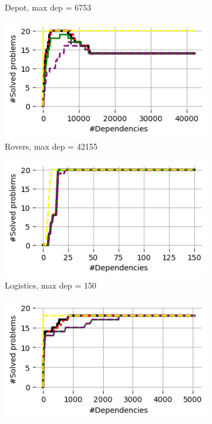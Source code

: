\documentclass{article}
\theoremstyle{remark}
\begin{document}
\begin{figure}[t!]
\begin{subfigure}[b]{0.3\textwidth}
  \caption{Depot, max dep = 6753}
  \label{fig:DepotMAFS}
\end{subfigure}\hspace{1em}
\begin{subfigure}[b]{0.3\textwidth}
\centering
  \includegraphics[width=1\linewidth]{Results_graphs/MAFS/coverage_MAFS_Rovers}
  \caption{Rovers, max dep = 42155}
  \label{fig:RoversMAFS}
\end{subfigure}\hspace{1em}
\begin{subfigure}[b]{0.3\textwidth}
\centering
  \includegraphics[width=1\linewidth]{Results_graphs/MAFS/coverage_MAFS_Logistics}
  \caption{Logistics, max dep = 150}
  \label{fig:LogisticsMAFS}
\end{subfigure}\hspace{1em}
\begin{subfigure}[b]{0.3\textwidth}
\centering
  \includegraphics[width=1\linewidth]{Results_graphs/MAFS/coverage_MAFS_Driverlog}

\end{subfigure}
\end{figure}
\end{document}
